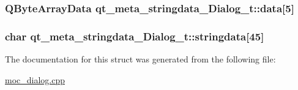 \subsubsection[{data}]{\setlength{\rightskip}{0pt plus 5cm}Q\+Byte\+Array\+Data qt\+\_\+meta\+\_\+stringdata\+\_\+\+Dialog\+\_\+t\+::data\mbox{[}5\mbox{]}}\label{structqt__meta__stringdata___dialog__t_ae8df3bc8b623c73ab4d9b75541fe0ed8}
\hypertarget{structqt__meta__stringdata___dialog__t_a769f7e87149e8f8b7b590952140417cd}{}
\subsubsection[{stringdata}]{\setlength{\rightskip}{0pt plus 5cm}char qt\+\_\+meta\+\_\+stringdata\+\_\+\+Dialog\+\_\+t\+::stringdata\mbox{[}45\mbox{]}}\label{structqt__meta__stringdata___dialog__t_a769f7e87149e8f8b7b590952140417cd}


The documentation for this struct was generated from the following file\+:\begin{DoxyCompactItemize}
\item 
\hyperlink{moc__dialog_8cpp}{moc\+\_\+dialog.\+cpp}\end{DoxyCompactItemize}
